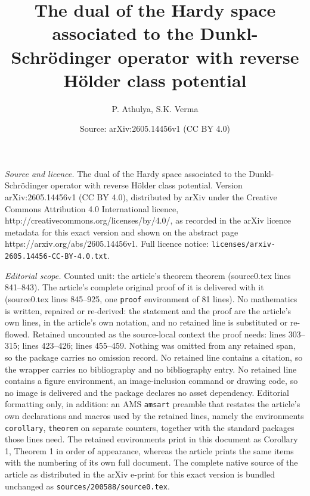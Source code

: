 \documentclass[10pt,a4paper]{amsart}
\title{The dual of the Hardy space associated to the Dunkl-Schr\"odinger operator with reverse H\"older class potential}
\author{P. Athulya, S.K. Verma}
\date{Source: arXiv:2605.14456v1 (CC BY 4.0)}
\begin{document}
\maketitle

\noindent\emph{Source and licence.} The dual of the Hardy space associated to the Dunkl-Schr\"odinger operator with reverse H\"older class potential. Version arXiv:2605.14456v1 (CC BY 4.0), distributed by arXiv under the Creative Commons Attribution 4.0 International licence, http://creativecommons.org/licenses/by/4.0/, as recorded in the arXiv licence metadata for this exact version and shown on the abstract page https://arxiv.org/abs/2605.14456v1. Full licence notice: \texttt{licenses/arxiv-2605.14456-CC-BY-4.0.txt}.\par\smallskip

\noindent\textit{Editorial scope.} Counted unit: the article's theorem theorem (source0.tex lines 841--843). The article's complete original proof of it is delivered with it (source0.tex lines 845--925, one \texttt{proof} environment of 81 lines). No mathematics is written, repaired or re-derived: the statement and the proof are the article's own lines, in the article's own notation, and no retained line is substituted or re-flowed.  Retained uncounted as the source-local context the proof needs: lines 303--315; lines 423--426; lines 455--459.  Nothing was omitted from any retained span, so the package carries no omission record.  No retained line contains a citation, so the wrapper carries no bibliography and no bibliography entry.  No retained line contains a figure environment, an image-inclusion command or drawing code, so no image is delivered and the package declares no asset dependency.  Editorial formatting only, in addition: an AMS \texttt{amsart} preamble that restates the article's own declarations and macros used by the retained lines, namely the environments \texttt{corollary}, \texttt{theorem} on separate counters, together with the standard packages those lines need.  The retained environments print in this document as Corollary 1, Theorem 1 in order of appearance, whereas the article prints the same items with the numbering of its own full document.  The complete native source of the article as distributed in the arXiv e-print for this exact version is bundled unchanged as \texttt{sources/200588/source0.tex}.
\end{document}

